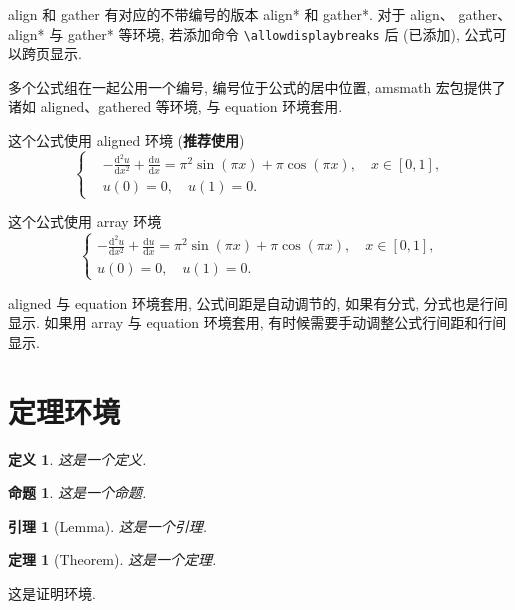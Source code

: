 \documentclass[UTF8,openany,twoside,12pt]{book}
\makeatletter
\theoremstyle{plain}
\newtheorem{definition}{定义}[chapter]
\newtheorem{proposition}{命题}[chapter]
\newtheorem{lemma}{引理}[chapter]
\newtheorem{theorem}{定理}[chapter]
\renewcommand{\proofname}{证明}
\renewenvironment{proof}[1][\proofname]{\par
  \pushQED{\qed}%
  \normalfont \topsep6\p@\@plus6\p@\relax
  \trivlist
  \item[\hskip\labelsep
        \bfseries
    #1\@addpunct{\,:\,}]\ignorespaces
}{%
  \popQED\endtrivlist\@endpefalse
}
\makeatother
\begin{document}
align 和 gather 有对应的不带编号的版本 align* 和 gather*.
对于 align、 gather、align* 与 gather* 等环境, 若添加命令 \verb|\allowdisplaybreaks| 后 (已添加), 公式可以跨页显示.

多个公式组在一起公用一个编号, 编号位于公式的居中位置, amsmath 宏包提供了诸如 aligned、gathered 等环境, 与 equation 环境套用.

这个公式使用 aligned 环境 (\textbf{推荐使用})
\begin{equation}\label{eqn:1}
\left\{\begin{aligned}
  &-\frac{\mathrm{d}^{2} u}{\mathrm{d} x^{2}}+\frac{\mathrm{d} u}{\mathrm{d} x}=\pi^{2} \sin (\pi x)+\pi \cos (\pi x),\quad x \in [0,1], \\
  &u(0)=0,\quad u(1)=0.
\end{aligned} \right.
\end{equation}

这个公式使用 array 环境
\begin{equation}\label{eqn:2}
\left\{\begin{array}{l}
\displaystyle
-\frac{\mathrm{d}^{2} u}{\mathrm{d} x^{2}}+\frac{\mathrm{d} u}{\mathrm{d} x}=\pi^{2} \sin (\pi x)+\pi \cos (\pi x),\quad x \in [0,1], \\[6pt]
u(0)=0,\quad u(1)=0.
\end{array} \right.
\end{equation}

aligned 与 equation 环境套用, 公式间距是自动调节的, 如果有分式, 分式也是行间显示. 如果用 array 与 equation 环境套用, 有时候需要手动调整公式行间距和行间显示.



\section{定理环境}

\begin{definition}
这是一个定义.
\end{definition}

\begin{proposition}
这是一个命题.
\end{proposition}

\begin{lemma}[Lemma] \label{lemma1}
这是一个引理.
\end{lemma}

\begin{theorem}[Theorem]
这是一个定理.
\end{theorem}
\begin{proof}
这是证明环境.
\end{proof}
\end{document}
